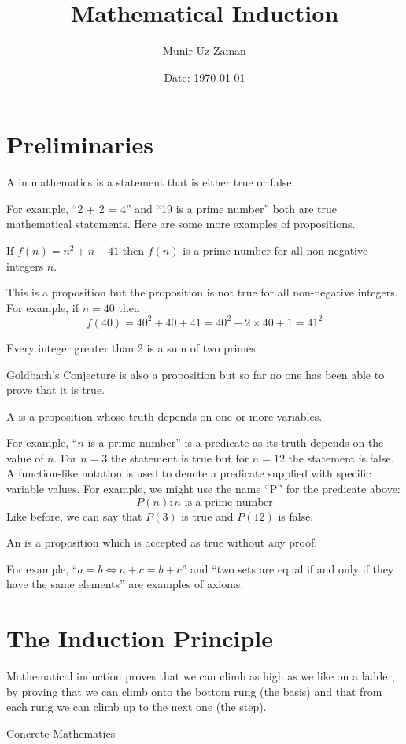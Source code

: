 \documentclass[11pt,numbers=noenddot,svgnames,dvipsnames]{scrartcl}
\title{Mathematical Induction}
\author{Munir Uz Zaman}
\date{Date: \today}
\begin{document}
\maketitle
\tableofcontents

\section{Preliminaries}
\begin{definition}
A  in mathematics is a statement that is either true or false.
\end{definition}
For example, ``2 + 2 = 4'' and ``19 is a prime number'' both are true mathematical statements. 
Here are some more examples of propositions.
\begin{proposition}
    If $f(n) = n^{2} + n + 41$ then $f(n)$ is a prime number for all non-negative integers $n$.
\end{proposition}
This is a proposition but the proposition is not true for all non-negative integers. 
For example, if $n=40$ then 
\[
    f(40) = 40^{2} + 40 + 41 = 40^{2} + 2\times 40 + 1 = 41^{2}
\]
\begin{proposition}
    Every integer greater than 2 is a sum of two primes.
\end{proposition}
Goldbach's Conjecture is also a proposition but so far no one has been able to 
prove that it is true.

\begin{definition}
    A  is a proposition whose truth depends on one or more variables.
\end{definition}
For example, ``$n$ is a prime number'' is a predicate as its truth depends on the value of $n$. 
For $n=3$ the statement is true but for $n=12$ the statement is false. 
A function-like notation is used to denote a predicate supplied with specific variable values. 
For example, we might use the name ``P'' for the predicate above:
\[
P(n) : n\text{ is a prime number}
\]
Like before, we can say that $P(3)$ is true and $P(12)$ is false.

\begin{definition}
    An  is a proposition which is accepted as true without any proof.
\end{definition}
For example, ``$a = b \iff a + c = b + c$'' and ``two sets are equal if and only if they have the same elements'' are 
examples of axioms.

\section{The Induction Principle}
\epigraph{
Mathematical induction proves that we can climb as high
as we like on a ladder, by proving that we can climb onto
the bottom rung (the basis) and that from each rung we
can climb up to the next one (the step).}{Concrete Mathematics}
\end{document}
